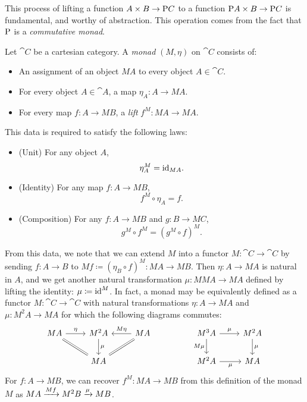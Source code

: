 \documentclass[DynamicalBook]{subfiles}
\begin{document}
This process of lifting a function $A \times B \to \mathrm{P} C$ to a function
$\mathrm{P} A \times B \to \mathrm{P} C$ is fundamental, and worthy of abstraction.
This operation comes from the fact that $\mathrm{P}$ is a \emph{commutative monad}.
\begin{definition}\label{def.commutative_monad}
Let $\cat{C}$ be a cartesian category. A \emph{monad} $(M, \eta)$ on $\cat{C}$ consists of:
\begin{itemize}
  \item An assignment of an object $MA$ to every object $A \in \cat{C}$.
  \item For every object $A \in \cat{A}$, a map $\eta_A : A \to MA$.
  \item For every map $f : A \to MB$, a \emph{lift} $f^M : MA \to MA$. 
\end{itemize}
This data is required to satisfy the following laws:
\begin{itemize}
  \item (Unit) For any object $A$, \[\eta_{A}^M = \mathrm{id}_{MA}.\]
  \item (Identity) For any map $f : A \to MB$, \[f^M \circ \eta_A = f.\]
  \item (Composition) For any $f : A \to MB$ and $g : B \to MC$,
\[ g^M \circ f^M = (g^M \circ f)^M.\]
\end{itemize}
From this data, we note that we can extend $M$ into a functor $M : \cat{C} \to
\cat{C}$ by sending $f : A \to B$ to $Mf \coloneqq (\eta_B \circ f)^M : MA \to
MB$.
Then $\eta : A \to MA$ is natural in $A$, and we get another natural
transformation $\mu : MM A \to M A$ defined by lifting the identity: $\mu
\coloneqq \mathrm{id}^M$. In fact, a monad may be equivalently defined as a functor $M :
\cat{C} \to \cat{C}$ with natural transformations $\eta : A \to MA$ and $\mu :
M^2 A \to MA$ for which the following diagrams commutes:
\begin{equation}\label{eqn.monad_laws}
\begin{tikzcd}
MA \arrow[r, "\eta"] \arrow[rd, equals] & M^2A \arrow[d, "\mu"] & MA \arrow[l, "M\eta"'] \arrow[ld, equals] &  & M^3A \arrow[r, "\mu"] \arrow[d, "M\mu"'] & M^2 A \arrow[d, "\mu"] \\
                                & MA                                &                                   &  & M^2 A \arrow[r, "\mu"']                  & MA                    
\end{tikzcd}
\end{equation}
For $f : A \to M B$, we can recover $f^M : M A \to MB$ from this definition of
the monad $M$ as
$M A \xrightarrow{M f} M^2 B \xrightarrow{\mu} M B$.


\end{definition}
\end{document}
